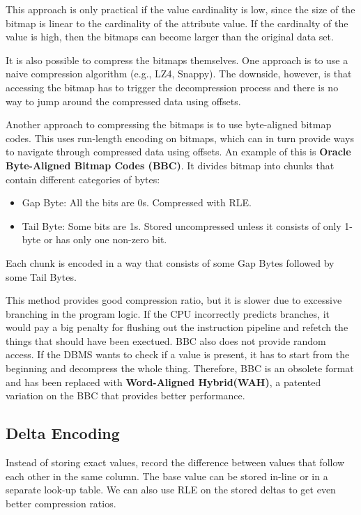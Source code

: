\documentclass[11pt]{article}
\begin{document}
This approach is only practical if the value cardinality is low, since the size of the bitmap is linear to the cardinality of the attribute value. If the cardinalty of the value is high, then the bitmaps can become larger than the original data set.

It is also possible to compress the bitmaps themselves. One approach is to use a naive compression algorithm (e.g., LZ4, Snappy). The downside, however, is that accessing the bitmap has to trigger the decompression process and there is no way to jump around the compressed data using offsets. 

Another approach to compressing the bitmaps is to use byte-aligned bitmap codes. This uses run-length encoding on bitmaps, which can in turn provide ways to navigate through compressed data using offsets. An example of this is \textbf{Oracle Byte-Aligned Bitmap Codes (BBC)}. It divides bitmap into chunks that contain different categories of bytes:
\begin{itemize}
    \item Gap Byte: All the bits are 0s. Compressed with RLE.
    \item Tail Byte: Some bits are 1s. Stored uncompressed unless it consists of only 1-byte or has only one non-zero bit.
\end{itemize}
Each chunk is encoded in a way that consists of some Gap Bytes followed by some Tail Bytes. 

This method provides good compression ratio, but it is slower due to excessive branching in the program logic. If the CPU incorrectly predicts branches, it would pay a big penalty for flushing out the instruction pipeline and refetch the things that should have been exectued. BBC also does not provide random access. If the DBMS wants to check if a value is present, it has to start from the beginning and decompress the whole thing. Therefore, BBC is an obsolete format and has been replaced with \textbf{Word-Aligned Hybrid(WAH)}, a patented variation on the BBC that provides better performance.

\subsection*{Delta Encoding}
Instead of storing exact values, record the difference between values that follow each other in the same column. The base value can be stored in-line or in a separate look-up table. We can also use RLE on the stored deltas to get even better compression ratios.
\end{document}
